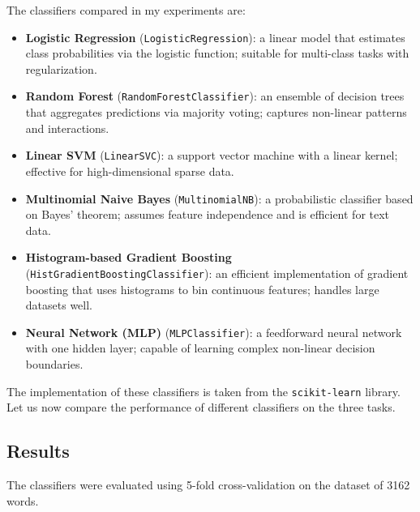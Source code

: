 The classifiers compared in my experiments are:
\begin{itemize}
    \item \textbf{Logistic Regression} (\texttt{LogisticRegression}): a linear model that estimates class probabilities via the logistic function; suitable for multi-class tasks with regularization.
    \item \textbf{Random Forest} (\texttt{RandomForestClassifier}): an ensemble of decision trees that aggregates predictions via majority voting; captures non-linear patterns and interactions.
    \item \textbf{Linear SVM} (\texttt{LinearSVC}): a support vector machine with a linear kernel; effective for high-dimensional sparse data.
    \item \textbf{Multinomial Naive Bayes} (\texttt{MultinomialNB}): a probabilistic classifier based on Bayes' theorem; assumes feature independence and is efficient for text data.
    \item \textbf{Histogram-based Gradient Boosting} (\texttt{HistGradientBoostingClassifier}): an efficient implementation of gradient boosting that uses histograms to bin continuous features; handles large datasets well.
    \item \textbf{Neural Network (MLP)} (\texttt{MLPClassifier}): a feedforward neural network with one hidden layer; capable of learning complex non-linear decision boundaries.
\end{itemize}


The implementation of these classifiers is taken from the \texttt{scikit-learn} library.
Let us now compare the performance of different classifiers on the three tasks.

\subsection{Results}
The classifiers were evaluated using 5-fold cross-validation on the dataset of 3162 words.

